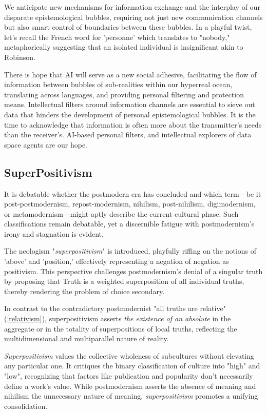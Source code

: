 \documentclass[11pt,a4]{article}
\begin{document}
    We anticipate new mechanisms for information exchange and the interplay of our disparate
    epistemological bubbles, requiring not just new communication channels but also smart control of
    boundaries between these bubbles.
    In a playful twist, let's recall the French word for 'personne' which translates to "nobody,"
    metaphorically suggesting that an isolated individual is insignificant akin to Robinson.




    There is hope that AI will serve as a new social adhesive, facilitating the flow of information
    between bubbles of sub-realities within our hyperreal ocean, translating across languages, and
    providing personal filtering and protection means. Intellectual filters around information channels
    are essential to sieve out data that hinders the development of personal epistemological bubbles.
    It is the time to acknowledge that information is often more about the transmitter's needs than the
    receiver's.  AI-based personal filters, and intellectual explorers of data space agents are our hope.
 \subsection{SuperPositivism}


    It is debatable whether the postmodern era has concluded and which term---be it post-postmodernism,
    repost-modernism, nihilism, post-nihilism, digimodernism, or metamodernism---might aptly describe
    the current cultural phase. Such classifications remain debatable, yet a discernible fatigue with
    postmodernism's irony and stagnation is evident.


   The neologism "\textit{superpositivism}" is introduced, playfully riffing on the notions of 'above'
    and 'position,' effectively representing a negation of negation as positivism. This perspective
    challenges postmodernism's denial of a singular truth by proposing that Truth is a weighted
    superposition of all individual truths, thereby rendering the problem of choice secondary.


    In contrast to the contradictory postmodernist "all truths are relative" (\ref{relativism}), superpositivism asserts \textit{the existence of an absolute} in the aggregate or in the totality of superpositions of local truths, reflecting the multidimensional and multiparallel nature of reality.

 \textit{Superpositivism} values the collective wholeness of subcultures without elevating any
    particular one. It critiques the binary classification of culture into "high" and "low",
    recognizing that factors like publication and popularity don't necessarily define a work's value.
    While postmodernism asserts the absence of meaning and nihilism the unnecessary nature of
    meaning, \textit{superpositivism} promotes a unifying consolidation.
\end{document}
